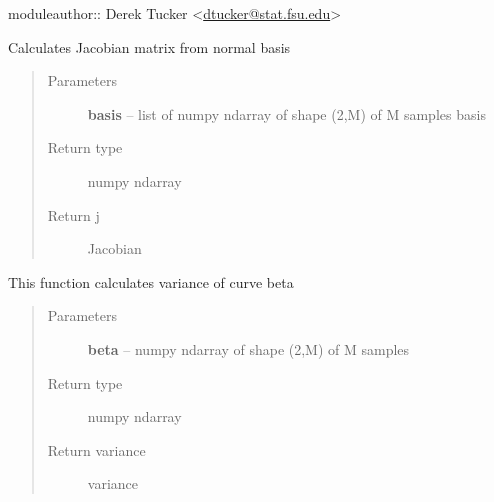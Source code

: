 \documentclass[letterpaper,10pt,english]{sphinxmanual}
\begin{document}
moduleauthor:: Derek Tucker \textless{}\href{mailto:dtucker@stat.fsu.edu}{dtucker@stat.fsu.edu}\textgreater{}

\begin{fulllineitems}
\label{curve_functions:curve_functions.calc_j}
Calculates Jacobian matrix from normal basis
\begin{quote}\begin{description}
\item[{Parameters}] \leavevmode
\textbf{basis} -- list of numpy ndarray of shape (2,M) of M samples basis

\item[{Return type}] \leavevmode
numpy ndarray

\item[{Return j}] \leavevmode
Jacobian

\end{description}\end{quote}

\end{fulllineitems}


\begin{fulllineitems}
\label{curve_functions:curve_functions.calculate_variance}
This function calculates variance of curve beta
\begin{quote}\begin{description}
\item[{Parameters}] \leavevmode
\textbf{beta} -- numpy ndarray of shape (2,M) of M samples

\item[{Return type}] \leavevmode
numpy ndarray

\item[{Return variance}] \leavevmode
variance

\end{description}\end{quote}

\end{fulllineitems}

\end{document}
